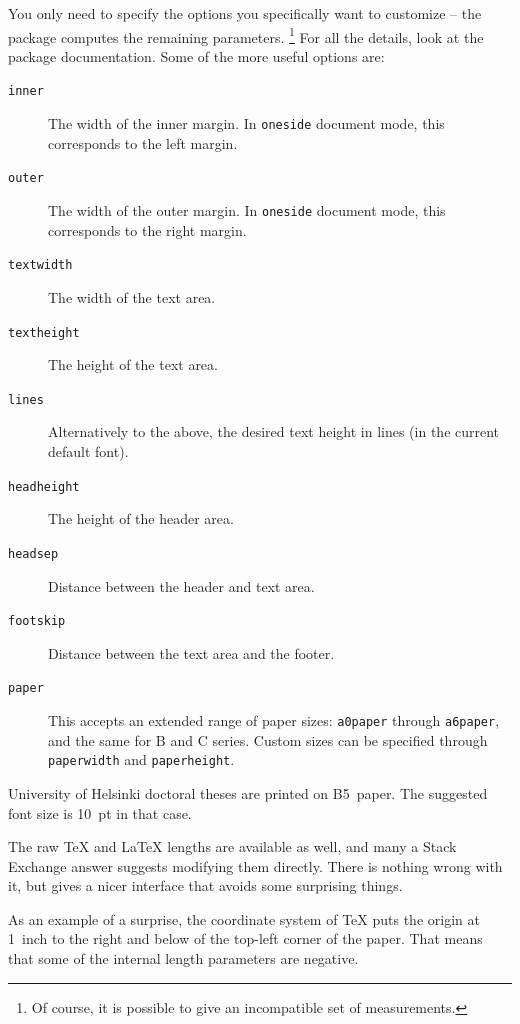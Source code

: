 You only need to specify the options you specifically want to customize
-- the package computes the remaining parameters.%
\footnote{Of course, it is possible to give an incompatible set of measurements.}
For all the details, look at the package documentation.
Some of the more useful options are:
\begin{description}
\item[\texttt{inner}] The width of the inner margin.
    In \verb|oneside| document mode, this corresponds to the left margin.
\item[\texttt{outer}] The width of the outer margin.
    In \verb|oneside| document mode, this corresponds to the right margin.
\item[\texttt{textwidth}] The width of the text area.
\item[\texttt{textheight}] The height of the text area.
\item[\texttt{lines}] Alternatively to the above,
    the desired text height in lines (in the current default font).
\item[\texttt{headheight}] The height of the header area.
\item[\texttt{headsep}] Distance between the header and text area.
\item[\texttt{footskip}] Distance between the text area and the footer.
\item[\texttt{paper}] This accepts an extended range of paper sizes:
    \verb|a0paper| through \verb|a6paper|, and the same for B and C series.
    Custom sizes can be specified through \verb|paperwidth| and \verb|paperheight|.
\end{description}

\begin{remark}
University of Helsinki doctoral theses are printed on B5~paper.
The suggested font size is 10~pt in that case.
\end{remark}

\begin{warning}
The raw \TeX{} and \LaTeX{} lengths are available as well,
and many a Stack Exchange answer suggests modifying them directly.
There is nothing wrong with it, but  gives a nicer interface
that avoids some surprising things.
\end{warning}

\begin{technote}
As an example of a surprise, the coordinate system of \TeX{}
puts the origin at 1~inch to the right and below of the top-left corner of the paper.
That means that some of the internal length parameters are negative.
\end{technote}


